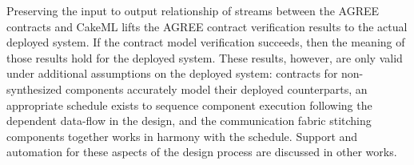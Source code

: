 Preserving the input to output relationship of streams between the AGREE contracts and CakeML lifts the AGREE contract verification results to the actual deployed system.
If the contract model verification succeeds, then the meaning of those results hold for the deployed system.
These results, however, are only valid under additional assumptions on the deployed system: contracts for non-synthesized components accurately model their deployed counterparts, an appropriate schedule exists to sequence component execution following the dependent data-flow in the design, and the communication fabric stitching components together works in harmony with the schedule.
Support and automation for these aspects of the design process are discussed in other works.